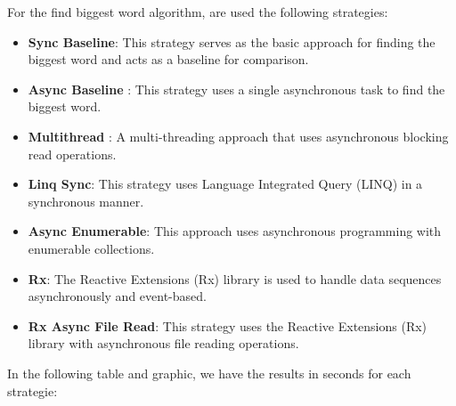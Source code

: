 For the find biggest word algorithm, are used the following strategies:

\begin{itemize}
    \item \textbf{Sync Baseline}: This strategy serves as the basic approach for finding the biggest word and acts as a baseline for comparison.
    \item \textbf{Async Baseline }: This strategy uses a single asynchronous task to find the biggest word.
    \item \textbf{Multithread }: A multi-threading approach that uses asynchronous blocking read operations.
    \item \textbf{Linq Sync}: This strategy uses Language Integrated Query (LINQ) in a synchronous manner.
    \item \textbf{Async Enumerable}: This approach uses asynchronous programming with enumerable collections.
    \item \textbf{Rx}: The Reactive Extensions (Rx) library is used to handle data sequences asynchronously and event-based.
    \item \textbf{Rx Async File Read}: This strategy uses the Reactive Extensions (Rx) library with asynchronous file reading operations.
\end{itemize}


In the following table and graphic, we have the results in seconds for each strategie:

\begin{table}[H]
    \centering
    \caption{Processing times for different strategies for "Find the biggest word".}
    \label{tab:biggest_word_results_cs_1}
\end{table}
    
